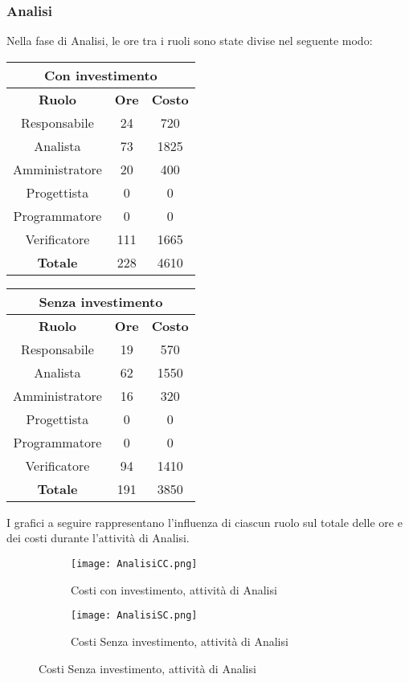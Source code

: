 \documentclass{scalatekids-article}
\begin{document}
\subsubsection{Analisi}
Nella fase di Analisi, le ore tra i ruoli sono state divise nel seguente modo:
\begin{center}
  \normalsize
  \begin{tabular}{| c | c | c |}
    \hline
    \multicolumn{3}{|c|}{\textbf{Con investimento}}\\
    \hline
    \textbf{Ruolo} & \textbf{Ore} & \textbf{Costo}\\
    \hline
    Responsabile & 24 & 720\\
    Analista & 73 & 1825\\
    Amministratore & 20 & 400\\
    Progettista & 0 & 0\\
    Programmatore & 0 & 0\\
    Verificatore & 111 & 1665 \\
    \hline
    \textbf{Totale} & 228 & 4610\\
    \hline
  \end{tabular}
  \qquad
  \begin{tabular}{| c | c | c |}
    \hline
    \multicolumn{3}{|c|}{\textbf{Senza investimento}}\\
    \hline
    \textbf{Ruolo} & \textbf{Ore} & \textbf{Costo}\\
    \hline
    Responsabile & 19 & 570\\
    Analista & 62 & 1550\\
    Amministratore & 16 & 320\\
    Progettista & 0 & 0\\
    Programmatore & 0 & 0\\
    Verificatore & 94 & 1410 \\
    \hline
    \textbf{Totale} & 191 & 3850\\
    \hline
  \end{tabular}
\end{center}
I grafici a seguire rappresentano l'influenza di ciascun ruolo sul totale delle ore e dei costi durante l'attività di Analisi.
\begin{figure}[H]
  \begin{subfigure}[H]{0.47\textwidth}
    \texttt{[image: AnalisiCC.png]}
    \caption{Costi con investimento, attività di Analisi}
  \end{subfigure}
  \qquad
  \begin{subfigure}[H]{0.47\textwidth}
    \texttt{[image: AnalisiSC.png]}
    \caption{Costi Senza investimento, attività di Analisi}
  \end{subfigure}
\end{figure}
\newpage
\end{document}
